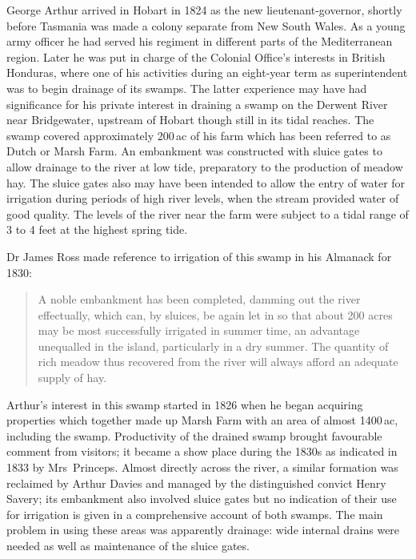George Arthur arrived in Hobart in 1824 as the new
lieutenant-governor, shortly before Tasmania was made a colony
separate from New South Wales.  As a young army officer he had served
his regiment in different parts of the Mediterranean region.  Later he
was put in charge of the Colonial Office's interests in British
Honduras, where one of his activities during an eight-year term as
superintendent was to begin drainage of its
swamps.
The latter experience may have had significance for his private
interest in draining a swamp on the Derwent River near Bridgewater,
upstream of Hobart though still in its tidal reaches. The swamp
covered approximately 200\,ac of his farm which has been referred to
as Dutch or Marsh Farm.  An embankment was constructed with sluice
gates to allow drainage to the river at low tide, preparatory to the
production of meadow hay.  The sluice gates also may have been
intended to allow the entry of water for irrigation during periods of
high river levels, when the stream provided water of good
quality.  The levels of the river near the farm were subject to a
tidal range of 3 to 4 feet at the highest spring tide.

Dr James Ross made reference to irrigation of this swamp in his
Almanack for 1830:
\begin{quote}
	A noble embankment has been completed, damming out the river
        effectually, which can, by sluices, be again let in so that
        about 200 acres may be most successfully irrigated in summer
        time, an advantage unequalled in the island, particularly in a
        dry summer. The quantity of rich meadow thus recovered from
        the river will always afford an adequate supply of
        hay.
\end{quote}

Arthur's interest in this swamp started in 1826 when he began
acquiring properties which together made up Marsh Farm with an area of
almost 1400\,ac, including the swamp.  Productivity of the drained
swamp brought favourable comment from visitors; it became a show place
during the 1830s as indicated in 1833 by
Mrs~Princeps.  Almost directly across the river, a similar formation was
reclaimed by Arthur Davies and managed by the distinguished convict
Henry Savery; its embankment also involved sluice gates but no
indication of their use for irrigation is given in a comprehensive
account of both swamps.  The main problem
in using these areas was apparently drainage: wide internal drains
were needed as well as maintenance of the sluice gates.

